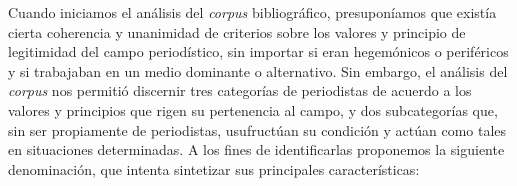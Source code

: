 %
%
%
%
%
%
%
%
%
%
%

Cuando iniciamos el análisis del \emph{corpus} bibliográfico, presuponíamos que existía cierta coherencia y unanimidad de criterios sobre los valores y principio de legitimidad del campo periodístico, sin importar si eran hegemónicos o periféricos y si trabajaban en un medio dominante o alternativo. Sin embargo, el análisis del \emph{corpus} nos permitió discernir tres categorías de periodistas de acuerdo a los valores y principios que rigen su pertenencia al campo, y dos subcategorías que, sin ser propiamente de periodistas, usufructúan su condición y actúan como tales en situaciones determinadas. A los fines de identificarlas proponemos la siguiente denominación, que intenta sintetizar sus principales características:

